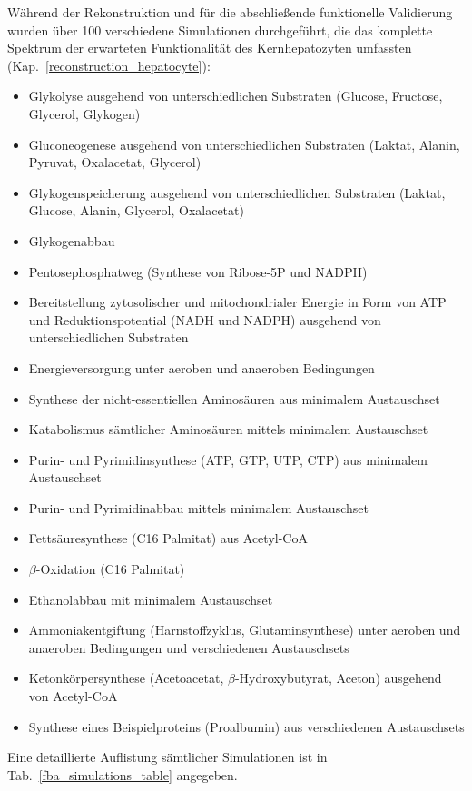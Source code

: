 Während der Rekonstruktion und für die abschließende funktionelle Validierung wurden über 100 verschiedene Simulationen durchgeführt, die das komplette Spektrum der erwarteten Funktionalität des Kernhepatozyten umfassten (Kap.~\ref{reconstruction_hepatocyte}):
\small
\begin{itemize}
 \item Glykolyse ausgehend von unterschiedlichen Substraten (Glucose, Fructose, Glycerol, Glykogen)
 \item Gluconeogenese ausgehend von unterschiedlichen Substraten (Laktat, Alanin, Pyruvat, Oxalacetat, Glycerol)
 \item Glykogenspeicherung ausgehend von unterschiedlichen Substraten (Laktat, Glucose, Alanin, Glycerol, Oxalacetat)
 \item Glykogenabbau
 \item Pentosephosphatweg (Synthese von Ribose-5P und NADPH)
 \item Bereitstellung zytosolischer und mitochondrialer Energie in Form von ATP und Reduktionspotential (NADH und NADPH) ausgehend von unterschiedlichen Substraten
 \item Energieversorgung unter aeroben und anaeroben Bedingungen
 \item Synthese der nicht-essentiellen Aminosäuren aus minimalem Austauschset
 \item Katabolismus sämtlicher Aminosäuren mittels minimalem Austauschset
 \item Purin- und Pyrimidinsynthese (ATP, GTP, UTP, CTP) aus minimalem Austauschset
 \item Purin- und Pyrimidinabbau mittels minimalem Austauschset
 \item Fettsäuresynthese (C16 Palmitat) aus Acetyl-CoA
 \item $\beta$-Oxidation (C16 Palmitat)
 \item Ethanolabbau mit minimalem Austauschset
 \item Ammoniakentgiftung (Harnstoffzyklus, Glutaminsynthese) unter aeroben und anaeroben Bedingungen und verschiedenen Austauschsets
 \item Ketonkörpersynthese (Acetoacetat, $\beta$-Hydroxybutyrat, Aceton) ausgehend von Acetyl-CoA
 \item Synthese eines Beispielproteins (Proalbumin) aus verschiedenen Austauschsets
\end{itemize}
\normalsize
Eine detaillierte Auflistung sämtlicher Simulationen ist in Tab.~\ref{fba_simulations_table} angegeben.
 
